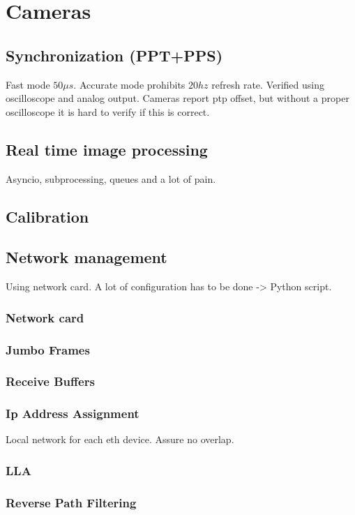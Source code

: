 \chapter{Cameras}


\section{Synchronization (PPT+PPS)}
Fast mode \approx $50\mu s$. Accurate mode prohibits $20hz$ refresh rate.
Verified using oscilloscope and analog output.
Cameras report ptp offset, but without a proper oscilloscope it is hard to verify if this is correct.


\section{Real time image processing}
Asyncio, subprocessing, queues and a lot of pain.



\section{Calibration}


\section{Network management}

Using network card.
A lot of configuration has to be done -> Python script.
\subsection*{Network card}
\subsection*{Jumbo Frames}
\subsection*{Receive Buffers}
\subsection*{Ip Address Assignment}
Local network for each eth device.
Assure no overlap.
\subsection*{LLA}
\subsection*{Reverse Path Filtering}



